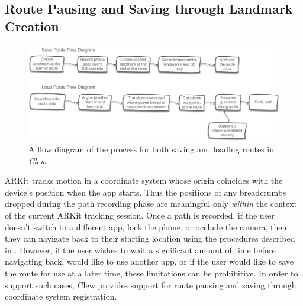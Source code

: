 \documentclass[chi_draft]{sigchi}
\begin{document}
\subsection{Route Pausing and Saving through Landmark Creation}
\begin{figure}
\begin{center}
\includegraphics[width=.7\linewidth]{Figures/FlowDiagram}
\end{center}
\caption{A flow diagram of the process for both saving and loading routes in \emph{Clew}.\label{fig:flow}}
\end{figure}
ARKit tracks motion in a coordinate system whose origin coincides with the device's position when the app starts.  Thus the positions of any breadcrumbs dropped during the path recording phase are meaningful only \emph{within} the context of the current ARKit tracking session.  Once a path is recorded, if the user doesn't switch to a different app, lock the phone, or occlude the camera, then they can navigate back to their starting location using the procedures described in \emph{}.  However, if the user wishes to wait a significant amount of time before navigating back, would like to use another app, or if the user would like to save the route for use at a later time, these limitations can be prohibitive.  In order to support such cases, Clew provides support for route pausing and saving through coordinate system registration.
\end{document}
